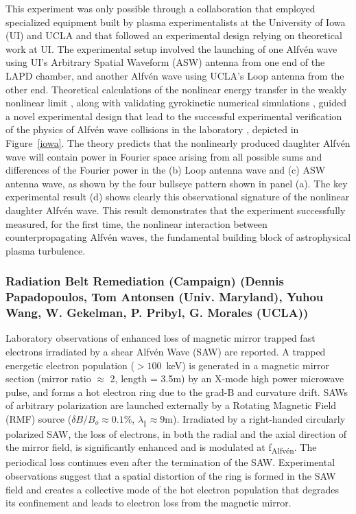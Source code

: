 \documentclass[11pt]{article}
\newcommand\Alfven{Alfv\'en }
\renewcommand{\cite}{\citep}
\begin{document}
This experiment was only possible through a collaboration that
employed specialized equipment built by plasma experimentalists at the
University of Iowa (UI) and UCLA and that followed an experimental
design relying on theoretical work at UI.  The experimental setup
involved the launching of one \Alfven wave using UI's Arbitrary
Spatial Waveform (ASW) antenna \citep{Thuecks:2009,Kletzing:2010} from
one end of the LAPD chamber, and another \Alfven wave using UCLA's
Loop antenna \citep{Auerbach:2011} from the other end. Theoretical
calculations of the nonlinear energy transfer in the weakly nonlinear
limit \cite{Howes:2013a}, along with validating gyrokinetic numerical
simulations \cite{Nielson:2013a}, guided a novel experimental design
\cite{Howes:2013b} that lead to the successful experimental
verification of the physics of \Alfven wave collisions in the
laboratory \cite{Howes:2012b,Drake:2013}, depicted in Figure~\ref{iowa}. The
theory predicts that the nonlinearly produced daughter \Alfven wave
will contain power in Fourier space arising from all possible sums and
differences of the Fourier power in the (b) Loop antenna wave and (c)
ASW antenna wave, as shown by the four bullseye pattern shown in panel
(a). The key experimental result (d) shows clearly this observational
signature of the nonlinear daughter \Alfven wave.  This result
demonstrates that the experiment successfully measured, for the first
time, the nonlinear interaction between counterpropagating \Alfven
waves, the fundamental building block of astrophysical plasma
turbulence.



\subsubsection{Radiation Belt Remediation (Campaign) (Dennis Papadopoulos, Tom
Antonsen (Univ. Maryland), Yuhou Wang, W. Gekelman, P. Pribyl, G.
Morales (UCLA))}

Laboratory observations of enhanced loss of magnetic mirror trapped fast
electrons irradiated by a shear Alfv\'{e}n Wave (SAW) are reported. A
trapped energetic electron population ($> 100$~keV) is
generated in a magnetic mirror section (mirror ratio $\approx$ 2,
length = 3.5m) by an X-mode high power microwave pulse, and forms a hot electron
ring due to the grad-B and curvature drift. SAWs of arbitrary
polarization are launched externally by a Rotating Magnetic Field (RMF)
source ($\delta B/B_o \approx 0.1$\%, $\lambda_\parallel \approx 9$m).
Irradiated by a right-handed circularly polarized SAW, the loss of
electrons, in both the radial and the axial direction of the mirror
field, is significantly enhanced and is modulated at
f\textsubscript{Alfv\'{e}n}. The periodical loss continues even after the
termination of the SAW. Experimental observations suggest that a spatial
distortion of the ring is formed in the SAW field and creates a
collective mode of the hot electron population that degrades its
confinement and leads to electron loss from the magnetic mirror.
\end{document}
